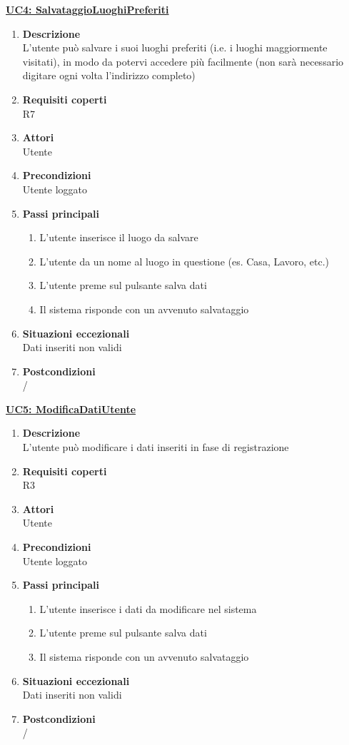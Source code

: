 \underline{\textbf{UC4: SalvataggioLuoghiPreferiti}}

\begin{enumerate}
\item\textbf{Descrizione}\\
L'utente può salvare i suoi luoghi preferiti (i.e. i luoghi maggiormente visitati), in modo da potervi accedere più facilmente (non sarà necessario digitare ogni volta l'indirizzo completo)
\item\textbf{Requisiti coperti}\\ R7
\item\textbf{Attori}\\ Utente
\item\textbf{Precondizioni}\\ Utente loggato
\item\textbf{Passi principali}
\begin{enumerate}
    \item L'utente inserisce il luogo da salvare
    \item L'utente da un nome al luogo in questione (es. Casa, Lavoro, etc.)
    \item L'utente preme sul pulsante salva dati
    \item Il sistema risponde con un avvenuto salvataggio
\end{enumerate}
\item\textbf{Situazioni eccezionali}\\ Dati inseriti non validi
\item\textbf{Postcondizioni}\\ /
\end{enumerate}


\underline{\textbf{UC5: ModificaDatiUtente}}

\begin{enumerate}
\item\textbf{Descrizione}\\
L'utente può modificare i dati inseriti in fase di registrazione
\item\textbf{Requisiti coperti}\\
R3
\item\textbf{Attori}\\
Utente
\item\textbf{Precondizioni}\\ Utente loggato
\item\textbf{Passi principali}
\begin{enumerate}
    \item L'utente inserisce i dati da modificare nel sistema
    \item L'utente preme sul pulsante salva dati
    \item Il sistema risponde con un avvenuto salvataggio
\end{enumerate}
\item\textbf{Situazioni eccezionali}\\
Dati inseriti non validi
\item\textbf{Postcondizioni}\\
/
\end{enumerate}

